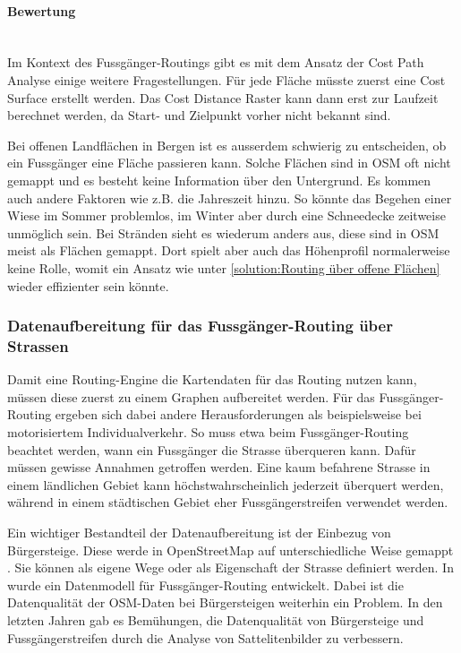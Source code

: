 \paragraph{Bewertung}~\\
Im Kontext des Fussgänger-Routings gibt es mit dem Ansatz der Cost Path Analyse einige weitere Fragestellungen. Für jede Fläche müsste zuerst eine Cost Surface erstellt werden. Das Cost Distance Raster kann dann erst zur Laufzeit berechnet werden, da Start- und Zielpunkt vorher nicht bekannt sind.

Bei offenen Landflächen in Bergen ist es ausserdem schwierig zu entscheiden, ob ein Fussgänger eine Fläche passieren kann. Solche Flächen sind in \ac{OSM} oft nicht gemappt und es besteht keine Information über den Untergrund. Es kommen auch andere Faktoren wie z.B. die Jahreszeit hinzu. So könnte das Begehen einer Wiese im Sommer problemlos, im Winter aber durch eine Schneedecke zeitweise unmöglich sein. Bei Stränden sieht es wiederum anders aus, diese sind in \ac{OSM} meist als Flächen gemappt. Dort spielt aber auch das Höhenprofil normalerweise keine Rolle, womit ein Ansatz wie unter \ref{solution:Routing über offene Flächen} wieder effizienter sein könnte.


\subsubsection{Datenaufbereitung für das Fussgänger-Routing über Strassen}
\label{subsub:Datenaufbereitung für das Fussgänger-Routing über Strassen}

Damit eine Routing-Engine die Kartendaten für das Routing nutzen kann, müssen diese zuerst zu einem Graphen aufbereitet werden. Für das Fussgänger-Routing ergeben sich dabei andere Herausforderungen als beispielsweise bei motorisiertem Individualverkehr. So muss etwa beim Fussgänger-Routing beachtet werden, wann ein Fussgänger die Strasse überqueren kann. Dafür müssen gewisse Annahmen getroffen werden. Eine kaum befahrene Strasse in einem ländlichen Gebiet kann höchstwahrscheinlich jederzeit überquert werden, während in einem städtischen Gebiet eher Fussgängerstreifen verwendet werden.

Ein wichtiger Bestandteil der Datenaufbereitung ist der Einbezug von Bürgersteige. Diese werde in OpenStreetMap auf unterschiedliche Weise gemappt \cite{osm_wiki_sidewalks}. Sie können als eigene Wege oder als Eigenschaft der Strasse definiert werden. In \cite{pedestrian_navigation_lang} wurde ein Datenmodell für Fussgänger-Routing entwickelt. Dabei ist die Datenqualität der \ac{OSM}-Daten bei Bürgersteigen weiterhin ein Problem. In den letzten Jahren gab es Bemühungen, die Datenqualität von Bürgersteige \cite{mapbox_sidewalk_improving} und Fussgängerstreifen \cite{crosswalks_aerial_extraction} durch die Analyse von Sattelitenbilder zu verbessern.

